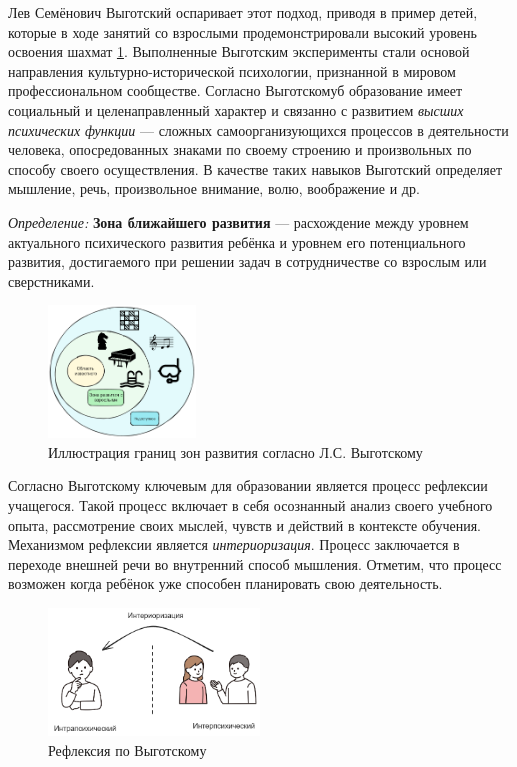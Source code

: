 Лев Семёнович Выготский оспаривает этот подход, приводя в пример детей, которые в ходе занятий со взрослыми продемонстрировали
высокий уровень освоения шахмат \ref{proximal_growth}. Выполненные Выготским
эксперименты стали основой направления культурно-исторической психологии, признанной в мировом профессиональном сообществе.
Согласно Выготскомуб образование имеет социальный и целенаправленный характер и связанно с развитием
\textit{высших психических функции} --- сложных самоорганизующихся процессов в деятельности человека, 
опосредованных знаками по своему строению и произвольных по способу своего осуществления. В качестве таких навыков Выготский
определяет мышление, речь, произвольное внимание, волю, воображение и др.

\textit{Определение:} \textbf{Зона ближайшего развития} --- расхождение между уровнем актуального психического развития ребёнка
 и уровнем его потенциального развития, достигаемого при решении задач в сотрудничестве со взрослым или сверстниками. 

\begin{figure}[h]
    \centering
    \includegraphics[width=0.35\textwidth]{assets/pedagogic/psy/proximal_growth.excalidraw.png}
    \caption{Иллюстрация границ зон развития согласно Л.С. Выготскому}
    \label{proximal_growth}
\end{figure}

Согласно Выготскому ключевым для образовании является процесс рефлексии учащегося.
Такой процесс включает в себя осознанный анализ своего учебного опыта, рассмотрение своих мыслей, чувств и действий в контексте обучения. 
Механизмом рефлексии является \textit{интериоризация}. Процесс заключается в переходе внешней речи во внутренний способ мышления.
Отметим, что процесс возможен когда ребёнок уже способен планировать свою деятельность. 
 
\begin{figure}[h]
    \centering
    \includegraphics[width=0.5\textwidth]{assets/pedagogic/psy/reflection.excalidraw.png}
    \caption{Рефлексия по Выготскому \cite{выготский2014мышление}}
    \label{reflection}
\end{figure}
 
